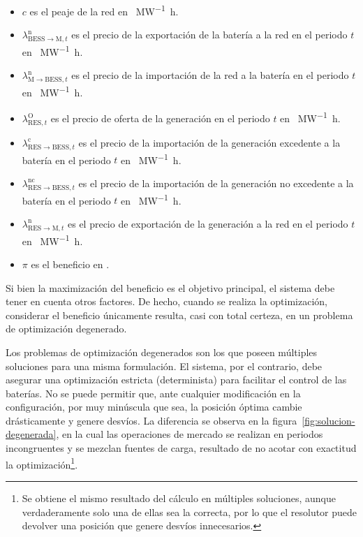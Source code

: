 \begin{itemize}

  \item \( c \) es el peaje de la red en \si{\text{\euro}\per\mega\watt\hour}.

  \item \( \lambda^{\mathrm{n}}_{\mathrm{BESS} \rightarrow \mathrm{M}, t} \) es el precio de la exportación de la batería a la red en el periodo \( t \) en \si{\text{\euro}\per\mega\watt\hour}.

  \item \( \lambda^{\mathrm{n}}_{\mathrm{M} \rightarrow \mathrm{BESS}, t}\) es el precio de la importación de la red a la batería en el periodo \( t \) en \si{\text{\euro}\per\mega\watt\hour}.

  \item \( \lambda^{\mathrm{O}}_{\mathrm{RES}, t} \) es el precio de oferta de la generación en el periodo \( t \) en \si{\text{\euro}\per\mega\watt\hour}.

  \item \( \lambda^{\mathrm{c}}_{\mathrm{RES} \rightarrow \mathrm{BESS}, t} \) es el precio de la importación de la generación excedente a la batería en el periodo \( t \) en \si{\text{\euro}\per\mega\watt\hour}.

  \item \( \lambda^{\mathrm{nc}}_{\mathrm{RES} \rightarrow \mathrm{BESS}, t} \) es el precio de la importación de la generación no excedente a la batería en el periodo \( t \) en \si{\text{\euro}\per\mega\watt\hour}.

  \item \( \lambda^{\mathrm{n}}_{\mathrm{RES} \rightarrow \mathrm{M}, t} \) es el precio de exportación de la generación a la red en el periodo \( t \) en \si{\text{\euro}\per\mega\watt\hour}.

  \item \( \pi \) es el beneficio en \si{\text{\euro}}.

\end{itemize}

Si bien la maximización del beneficio es el objetivo principal, el sistema debe tener en cuenta otros factores. De hecho, cuando se realiza la optimización, considerar el beneficio únicamente resulta, casi con total certeza, en un problema de optimización degenerado.

Los problemas de optimización degenerados son los que poseen múltiples soluciones para una misma formulación. El sistema, por el contrario, debe asegurar una optimización estricta (determinista) para facilitar el control de las baterías. No se puede permitir que, ante cualquier modificación en la configuración, por muy minúscula que sea, la posición óptima cambie drásticamente y genere desvíos. La diferencia se observa en la figura~\ref{fig:solucion-degenerada}, en la cual las operaciones de mercado se realizan en periodos incongruentes y se mezclan fuentes de carga, resultado de no acotar con exactitud la optimización\footnote{Se obtiene el mismo resultado del cálculo en múltiples soluciones, aunque verdaderamente solo una de ellas sea la correcta, por lo que el resolutor puede devolver una posición que genere desvíos innecesarios.}.


